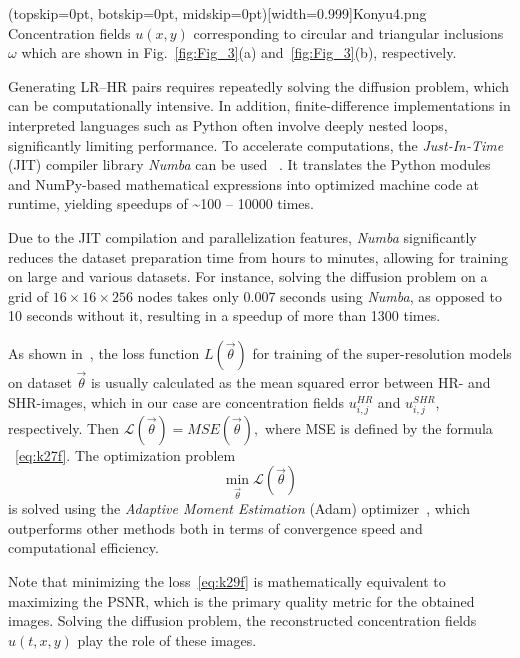 \documentclass{ieeeaccess}
\begin{document}
\Figure[ht!](topskip=0pt, botskip=0pt, midskip=0pt)[width=0.999\linewidth]{Konyu4.png}
{Concentration fields $u(x,y)$ corresponding to circular and triangular inclusions $\omega$ which are shown in Fig.~\ref{fig:Fig_3}(a) and~\ref{fig:Fig_3}(b), respectively.
\label{fig:Fig_4}}

Generating LR–HR pairs requires repeatedly solving the diffusion problem, which can be computationally intensive.  In addition, finite-difference implementations in interpreted languages such as Python often involve deeply nested loops, significantly limiting performance.
To accelerate computations, the \textit{Just-In-Time} (JIT) compiler library \textit{Numba} can be used ~\cite{Lam}. It translates the Python modules and NumPy-based mathematical expressions into optimized machine code at runtime, yielding speedups of \textasciitilde100 -- 10000 times. 

Due to the JIT compilation and parallelization features, \textit{Numba} significantly reduces the dataset preparation time from hours to minutes, allowing for training on large and various datasets. For instance, solving the diffusion problem on a grid of $16 \times 16 \times 256$ nodes takes only 0.007 seconds using \textit{Numba}, as opposed to 10 seconds without it, resulting in a speedup of more than 1300 times.

As shown in~\cite{Weiqin_SR}, the loss function $L(\vec{\theta})$ for training of the super-resolution models on  dataset $\vec{\theta}$ is usually calculated as the mean squared error between HR- and SHR-images, which in our case are concentration fields ${u_{i,j}^{HR}}$ and ${u_{i,j}^{{SHR}}}$, respectively. Then 
$
 \mathcal{L} (\vec{\theta}) = MSE(\vec{\theta}),
$
where MSE is defined by the formula ~\eqref{eq:k27f}. The optimization problem
%
\begin{equation} \label{eq:k29f}
\min_{\vec{\theta}} \mathcal{L} (\vec \theta)
\end{equation}
%
is solved using the \textit{Adaptive Moment Estimation} (Adam) optimizer~\cite{Kingma}, which outperforms other methods both in terms of  convergence speed and computational efficiency.

Note that minimizing the loss~\eqref{eq:k29f} is mathematically equivalent to maximizing the PSNR, which is the primary quality metric for the obtained images. Solving the diffusion problem, the reconstructed concentration fields $u(t,x,y)$ play the role of these images.
 
\end{document}

